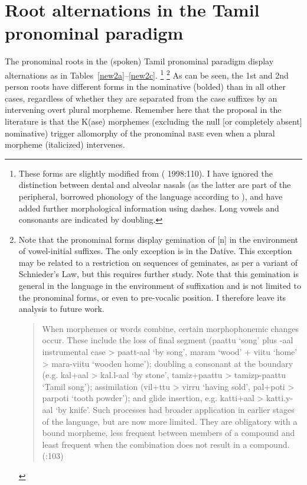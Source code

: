 \documentclass[output=paper,colorlinks,citecolor=brown,
]{langscibook}
\begin{document}
\section{Root alternations in the Tamil pronominal paradigm}

The pronominal roots in the (spoken) Tamil pronominal paradigm display alternations as in Tables~\ref{new2a}--\ref{new2c}.%
    \footnote{These forms are slightly modified from (\citealt{steever2019dravidian} 1998:110). I have ignored the distinction between dental and alveolar nasals (as the latter are part of the peripheral, borrowed phonology of the language according to \citeauthor{steever2019dravidian}), and have added further morphological information using dashes. Long vowels and consonants are indicated by doubling.}%
    \footnote{Note that the pronominal forms display gemination of [n] in the environment of vowel-initial suffixes. The only exception is in the Dative. This exception may be related to a restriction on sequences of geminates, as per a variant of Schnieder’s Law, but this requires further study. Note that this gemination is general in the language in the environment of suffixation and is not limited to the pronominal forms, or even to pre-vocalic position. I therefore leave its analysis to future work. 
        \begin{quote}
            When morphemes or words combine, certain morphophonemic changes occur. These include the loss of final segment (paattu ‘song’ plus -aal instrumental case > paatt-aal ‘by song’, maram ‘wood’ + viitu ‘home’ > mara-viitu ‘wooden home’); doubling a consonant at the boundary (e.g. kal+aal > kal.l-aal ‘by stone’, tamiz+paattu > tamizp-paattu ‘Tamil song’); assimilation (vil+ttu > virru ‘having sold’, pal+poti > parpoti ‘tooth powder’); and glide insertion, e.g. katti+aal > katti.y-aal ‘by knife’. Such processes had broader application in earlier stages of the language, but are now more limited. They are obligatory with a bound morpheme, less frequent between members of a compound and least frequent when the combination does not result in a compound. (\citealt{steever2019dravidian}:103) 
        \end{quote}
    } 
As can be seen, the 1st and 2nd person roots have different forms in the nominative (bolded) than in all other cases, regardless of whether they are separated from the case suffixes by an intervening overt plural morpheme. Remember here that the proposal in the literature is that the K(ase) morphemes (excluding the null [or completely absent] nominative) trigger allomorphy of the pronominal \textsc{base} even when a plural morpheme (italicized) intervenes.
\end{document}
